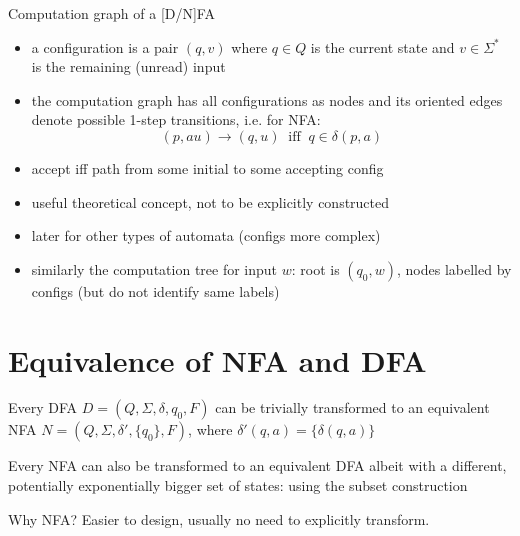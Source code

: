 \documentclass[handout]{beamer}
\begin{document}
\begin{frame}{Computation graph of a [D/N]FA}

    \begin{itemize}
        \item a \alert{configuration} is a pair $(q,v)$ where $q\in Q$ is the current state and $v\in\Sigma^*$ is the remaining (unread) input
        \item the \alert{computation graph} has all configurations as nodes and its oriented edges denote possible 1-step transitions, i.e. for NFA: $$(p,au)\to(q, u)\ \text{ iff }\ q\in \delta(p,a)$$
        \item accept iff path from some initial to some accepting config
        \item useful theoretical concept, not to be explicitly constructed
        \item later for other types of automata (configs more complex)
        \item similarly the \alert{computation tree} for input $w$: root is $(q_0,w)$, nodes labelled by configs (but do not identify same labels)        
    \end{itemize}

\end{frame}


\section*{Equivalence of NFA and DFA}


\begin{frame}{}

    Every DFA $D=(Q,\Sigma,\delta,q_0,F)$ can be trivially transformed to an equivalent NFA $N=(Q,\Sigma,\delta',\{q_0\},F)$, where \alert{$\delta'(q,a)=\{\delta(q,a)\}$}

    \bigskip

    Every NFA can also be transformed to an equivalent DFA albeit with a different, potentially \alert{exponentially bigger} set of states: using the \alert{subset construction}

    \bigskip

    Why NFA? Easier to design, usually no need to explicitly transform.

\end{frame}
\end{document}
